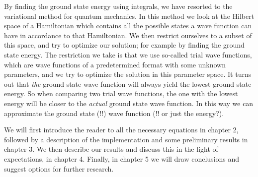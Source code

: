 By finding the ground state energy using integrals, we have resorted to the variational method for quantum
mechanics. In this method we look at the Hilbert space of a Hamiltonian which contains all the possible states
a wave function can have in accordance to that Hamiltonian. We then restrict ourselves to a subset of this space,
and try to optimize our solution; for example by finding the ground state energy. The restriction we take is that
we use so-called trial wave functions, which are wave functions of a predetermined format with some unknown parameters,
and we try to optimize the solution in this parameter space. It turns out that \textit{the} ground state wave function
will always yield the lowest ground state energy. So when comparing two trial wave functions, the one with the lowest
energy will be closer to the \textit{actual} ground state wave function. In this way we can approximate the ground state
(!!) wave function (!! or just the energy?). \cite{AdvStatMech}

We will first introduce the reader to all the necessary equations in chapter 2, followed by a description of the
implementation and some preliminary results in chapter 3. We then describe our results and discuss this in the light
of expectations, in chapter 4. Finally, in chapter 5 we will draw conclusions and suggest options for further research.
